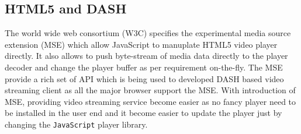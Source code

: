 \subsection{HTML5 and DASH}
The world wide web consortium (W3C) specifies the experimental media source extension (MSE) which allow JavaScript to manuplate HTML5 video player directly. It also allows to push byte-stream of media data directly to the player decoder and change the player buffer as per requirement on-the-fly. The MSE provide a rich set of API which is being used to developed DASH based video streaming client as all the major browser support the MSE. With introduction of MSE, providing video streaming service become easier as no fancy player need to be installed in the user end and it become easier to update the player just by changing the {\tt JavaScript} player library.
